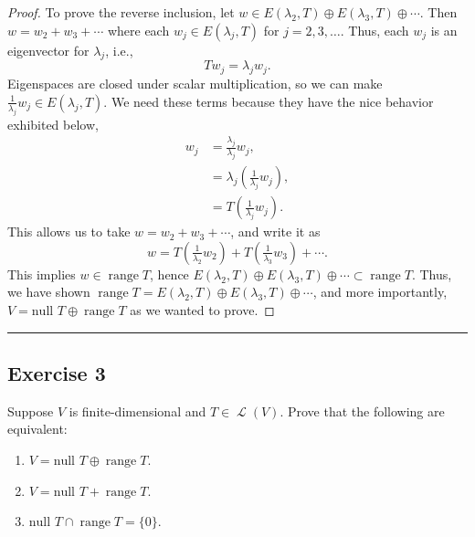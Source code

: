 \documentclass[letterpaper, 12pt]{amsart}
\DeclareMathOperator{\Ell}{\mathscr{L}}				%
\renewcommand{\null}{\text{null }}					%
\DeclareMathOperator{\range}{\text{range }}			%
\theoremstyle{definition}  							%
\begin{document}
\begin{proof}
		To prove the reverse inclusion, let $w \in E(\lambda_{2},T) \oplus E(\lambda_{3}, T) \oplus \cdots$.
		Then $w = w_{2} + w_{3} + \cdots$ where each $w_{j} \in E(\lambda_{j},T)$ for $j = 2,3,\dots$.
		Thus, each $w_{j}$ is an eigenvector for $\lambda_{j}$, i.e., $$Tw_{j} = \lambda_{j}w_{j}.$$
		Eigenspaces are closed under scalar multiplication, so we can make $\tfrac{1}{\lambda_{j}}w_{j} \in E(\lambda_{j},T)$.
		We need these terms because they have the nice behavior exhibited below,
			\begin{align*}
				w_{j} &= \frac{\lambda_{j}}{\lambda_{j}} w_{j}, \\
				&= \lambda_{j}\left(\tfrac{1}{\lambda_{j}} w_{j} \right), \\
				&= T\left(\tfrac{1}{\lambda_{j}} w_{j} \right).
			\end{align*}
		This allows us to take $w = w_{2} + w_{3} + \cdots$, and write it as $$w = T\left(\tfrac{1}{\lambda_{2}} w_{2}\right) + T\left(\tfrac{1}{\lambda_{3}} w_{3}\right) + \cdots.$$
		This implies $w \in \range T$, hence $E(\lambda_{2},T) \oplus E(\lambda_{3}, T) \oplus \cdots \subset \range T$.
		Thus, we have shown $\range T = E(\lambda_{2},T) \oplus E(\lambda_{3}, T) \oplus \cdots$, and more importantly, $V = \null T \oplus \range T$ as we wanted to prove.
		\end{proof}
		\vspace*{2mm}
		\hrule
		\vspace*{2mm}

		\subsection*{Exercise 3}
		Suppose $V$ is finite-dimensional and $T \in \Ell(V)$. 
		Prove that the following are equivalent:
			\begin{enumerate}[\hspace*{5mm}(a)]
				\item $V = \null T \oplus \range T$.
				\item $V = \null T + \range T$.
				\item $\null T \cap \range T = \{0\}$.
			\end{enumerate}
		\vspace*{3mm}
\end{document}
